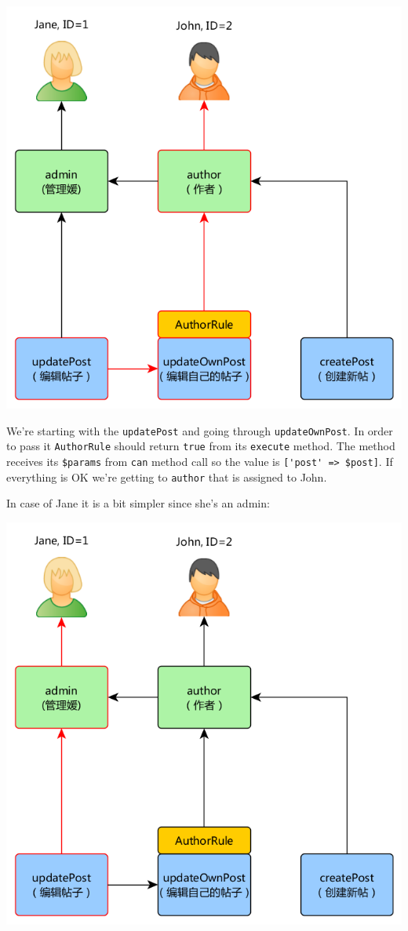 \noindent\includegraphics[width=\textwidth]{images/rbac-access-check-2.png}

We're starting with the \lstinline|updatePost| and going through \lstinline|updateOwnPost|. In order to pass it \lstinline|AuthorRule| should return
\lstinline|true| from its \lstinline|execute| method. The method receives its \lstinline|$params| from \lstinline|can| method call so the value is
\lstinline|['post' => $post]|. If everything is OK we're getting to \lstinline|author| that is assigned to John.

In case of Jane it is a bit simpler since she's an admin:

\noindent\includegraphics[width=\textwidth]{images/rbac-access-check-3.png}


